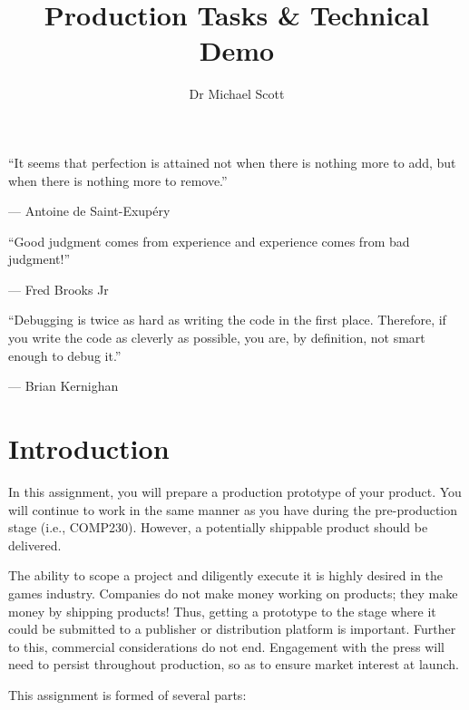 \documentclass{../../fal_assignment}
\title{Production Tasks \& Technical Demo}
\author{Dr Michael Scott}
\begin{document}
\maketitle

\begin{marginquote}
    ``It seems that perfection is attained not when there is nothing more to add,
        but when there is nothing more to remove.''
    
    --- Antoine de Saint-Exup\'ery
    
    \marginquoterule
    
    ``Good judgment comes from experience and experience comes from bad judgment!''
    
    --- Fred Brooks Jr
    
    \marginquoterule
    
    ``Debugging is twice as hard as writing the code in the first place.
     Therefore, if you write the code as cleverly as possible, you are, by definition, not smart enough to debug it.'' 
 
         --- Brian Kernighan
     
\end{marginquote}

\section*{Introduction}

In this assignment, you will prepare a production prototype of your product. You will continue to work in the same manner as you have during the pre-production stage (i.e., COMP230). However, a potentially shippable product should be delivered.

The ability to scope a project and diligently execute it is highly desired in the games industry. Companies do not make money working on products; they make money by shipping products! Thus, getting a prototype to the stage where it could be submitted to a publisher or distribution platform is important. Further to this, commercial considerations do not end. Engagement with the press will need to persist throughout production, so as to ensure market interest at launch.

This assignment is formed of several parts:
\end{document}
